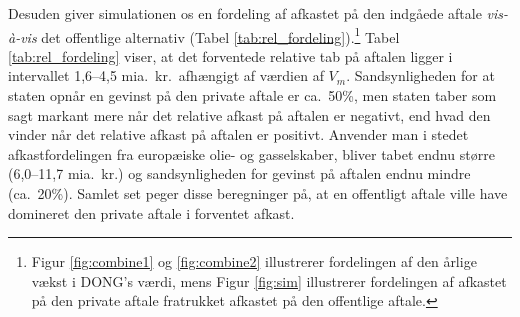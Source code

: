 \documentclass{article}
\begin{document}
Desuden giver simulationen os en fordeling af afkastet på den indgåede aftale \emph{vis-\`{a}-vis} det offentlige alternativ (Tabel \ref{tab:rel_fordeling}).\footnote{Figur \ref{fig:combine1} og \ref{fig:combine2} illustrerer fordelingen af den årlige vækst i DONG's værdi, mens Figur \ref{fig:sim} illustrerer fordelingen af afkastet på den private aftale fratrukket afkastet på den offentlige aftale.} Tabel \ref{tab:rel_fordeling} viser, at det forventede relative tab på aftalen ligger i intervallet 1,6--4,5 mia.\ kr.\ afhængigt af værdien af $V_m$. Sandsynligheden for at staten opnår en gevinst på den private aftale er ca.\ 50\%, men staten taber som sagt markant mere når det relative afkast på aftalen er negativt, end hvad den vinder når det relative afkast på aftalen er positivt. Anvender man i stedet afkastfordelingen fra europæiske olie- og gasselskaber, bliver tabet endnu større (6,0--11,7 mia.\ kr.) og sandsynligheden for gevinst på aftalen endnu mindre (ca.\ 20\%). Samlet set peger disse beregninger på, at en offentligt aftale ville have domineret den private aftale i forventet afkast.
\end{document}
